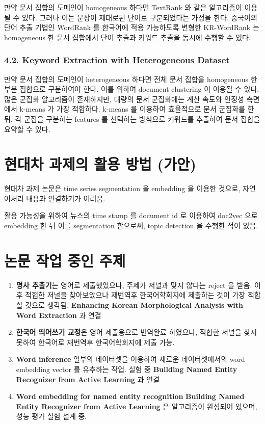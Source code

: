 \documentclass[11pt]{article}
\begin{document}
만약 문서 집합의 도메인이 homogeneous 하다면 TextRank 와 같은 알고리즘이 이용될 수 있다. 그러나 이는 문장이 제대로된 단어로 구분되었다는 가정을 한다. 중국어의 단어 추출 기법인 WordRank 를 한국어에 적용 가능하도록 변형한 KR-WordRank 는 homogeneous 한 문서 집합에서 단어 추출과 키워드 추출을 동시에 수행할 수 있다.

\subsubsection*{4.2. Keyword Extraction with Heterogeneous Dataset}

만약 문서 집합의 도메인이 heterogeneous 하다면 전체 문서 집합을 homogeneous 한 부분 집합으로 구분하여야 한다. 이를 위하여 document clustering 이 이용될 수 있다. 많은 군집화 알고리즘이 존재하지만, 대량의 문서 군집화에는 계산 속도와 안정성 측면에서 k-means 가 가장 적합하다. k-means 를 이용하여 효율적으로 문서 군집화를 한 뒤, 각 군집을 구분하는 features 를 선택하는 방식으로 키워드를 추출하여 문서 집합을 요약할 수 있다.


\section{현대차 과제의 활용 방법 (가안)}

현대차 과제 논문은 time series segmentation 을 embedding 을 이용한 것으로, 자연어처리 내용과 연결하기가 어려움. 

활용 가능성을 위하여 뉴스의 time stamp 를 document id 로 이용하여 doc2vec 으로 embedding 한 뒤 이를 segmentation 함으로써, topic detection 을 수행한 적이 있음. 

\section{논문 작업 중인 주제}

\begin{enumerate}
    \item \textbf{명사 추출기}는 영어로 제출했었으나, 주제가 저널과 맞지 않다는 reject 을 받음. 이후 적헙한 저널을 찾아보았으나 재번역후 한국어학회지에 제출하는 것이 가장 적합할 것으로 생각됨. \textbf{Enhancing Korean Morphological Analysis with Word Extraction} 과 연결
    \item \textbf{한국어 띄어쓰기 교정}은 영어 제출용으로 번역완료 하였으나, 적합한 저널을 찾지 못하여 한국어로 재번역후 한국어학회지에 제출 가능.
    \item \textbf{Word inference} 일부의 데이터셋을 이용하여 새로운 데이터셋에서의 word embedding vector 를 유추하는 작업. 실험 중 \textbf{Building Named Entity Recognizer from Active Learning} 과 연결
    \item \textbf{Word embedding for named entity recognition} \textbf{Building Named Entity Recognizer from Active Learning} 은 알고리즘이 완성되어 있으며, 성능 평가 실험 설계 중.
\end{enumerate}
\end{document}
